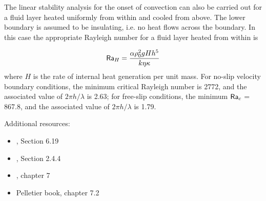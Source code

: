 The linear stability analysis for the onset of convection can also 
be carried out for a fluid layer heated uniformly from within and cooled from above. 
The lower boundary is assumed to be insulating, i.e. no heat flows across the boundary. 
In this case the appropriate Rayleigh
number for a fluid layer heated from within is

\[
{\mathsf{Ra}}_H = \frac{\alpha \rho_0^2 g H h^5 }{k  \eta \kappa}
\]
where $H$ is the rate of internal heat generation per unit
mass. For no-slip velocity boundary conditions, the
minimum critical Rayleigh number is 2772, and the
associated value of $2 \pi h/\lambda$ is 2.63; for free-slip conditions, 
the minimum ${\mathsf{Ra}}_c$ = 867.8, and the associated value of
$2 \pi h/\lambda$ is 1.79.

\vspace{1cm}

Additional resources:
\begin{itemize}
\item {}, Section 6.19
\item {}, Section 2.4.4
\item {}, chapter 7
\item Pelletier book, chapter 7.2
\end{itemize}











